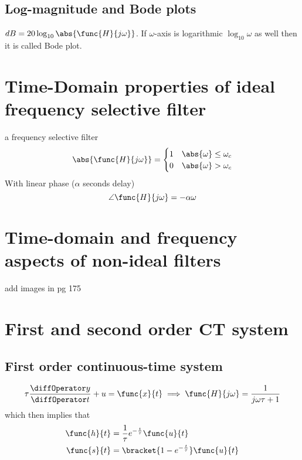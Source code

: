\subsection*{Log-magnitude and Bode plots}
\(dB = 20 \log_{10} \abs{\func{H}{j\omega}}\). If \(\omega\)-axis is logarithmic \(\log_{10} \omega\) as well then it is called Bode plot.

\section{Time-Domain properties of ideal frequency selective filter}
a frequency selective filter 
\begin{equation*}
    \abs{\func{H}{j \omega}} = \begin{cases}
        1 & \abs{\omega} \leq \omega_c \\
        0 & \abs{\omega} > \omega_c
    \end{cases}
\end{equation*}
With linear phase (\(\alpha\) seconds delay)
\begin{equation*}
    \angle \func{H}{j\omega} = -\alpha \omega 
\end{equation*}

\section{Time-domain and frequency aspects of non-ideal filters}
add images in pg 175

\section{First and second order CT system}
\subsection*{First order continuous-time system}

\begin{equation*}
    \tau \dfrac{\diffOperator y}{\diffOperator t} + u = \func{x}{t} \implies \func{H}{j\omega} = \dfrac{1}{j \omega \tau + 1}
\end{equation*}
which then implies that 
\begin{align*}
    \func{h}{t} &= \dfrac{1}{\tau} e^{-\frac{t}{\tau}} \func{u}{t}\\
    \func{s}{t} &= \bracket{ 1 - e^{-\frac{t}{\tau}}} \func{u}{t}
\end{align*}

